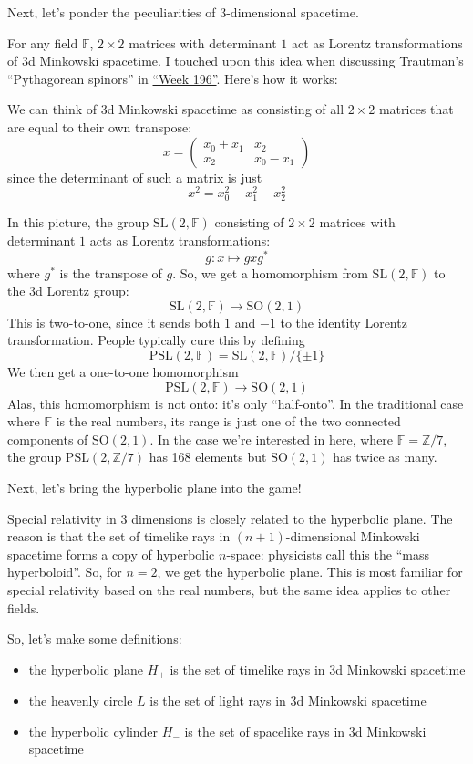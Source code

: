 \documentclass{article}
\def\tightlist{}
\begin{document}
Next, let's ponder the peculiarities of \(3\)-dimensional spacetime.

For any field \(\mathbb{F}\), \(2\times2\) matrices with determinant
\(1\) act as Lorentz transformations of 3d Minkowski spacetime. I
touched upon this idea when discussing Trautman's ``Pythagorean
spinors'' in \protect\hyperlink{week196}{``Week 196''}. Here's how it
works:

We can think of 3d Minkowski spacetime as consisting of all \(2\times2\)
matrices that are equal to their own transpose: \[
  x = \left(
    \begin{array}{cc}
      x_0+x_1 & x_2
    \\x_2 & x_0-x_1
    \end{array}
  \right)
\] since the determinant of such a matrix is just
\[x^2 = x_0^2 - x_1^2 - x_2^2\]

In this picture, the group \(\mathrm{SL}(2,\mathbb{F})\) consisting of
\(2\times2\) matrices with determinant \(1\) acts as Lorentz
transformations: \[g\colon x \mapsto gxg^*\] where \(g^*\) is the
transpose of \(g\). So, we get a homomorphism from
\(\mathrm{SL}(2,\mathbb{F})\) to the 3d Lorentz group:
\[\mathrm{SL}(2,\mathbb{F}) \to \mathrm{SO}(2,1)\] This is two-to-one,
since it sends both \(1\) and \(-1\) to the identity Lorentz
transformation. People typically cure this by defining
\[\mathrm{PSL}(2,\mathbb{F}) = \mathrm{SL}(2,\mathbb{F})/\{\pm1\}\] We
then get a one-to-one homomorphism
\[\mathrm{PSL}(2,\mathbb{F}) \to \mathrm{SO}(2,1)\] Alas, this
homomorphism is not onto: it's only ``half-onto''. In the traditional
case where \(\mathbb{F}\) is the real numbers, its range is just one of
the two connected components of \(\mathrm{SO}(2,1)\). In the case we're
interested in here, where \(\mathbb{F} = \mathbb{Z}/7\), the group
\(\mathrm{PSL}(2,\mathbb{Z}/7)\) has 168 elements but
\(\mathrm{SO}(2,1)\) has twice as many.

Next, let's bring the hyperbolic plane into the game!

Special relativity in 3 dimensions is closely related to the hyperbolic
plane. The reason is that the set of timelike rays in
\((n+1)\)-dimensional Minkowski spacetime forms a copy of hyperbolic
\(n\)-space: physicists call this the ``mass hyperboloid''. So, for
\(n = 2\), we get the hyperbolic plane. This is most familiar for
special relativity based on the real numbers, but the same idea applies
to other fields.

So, let's make some definitions:

\begin{itemize}
\tightlist
\item
  the hyperbolic plane \(H_+\) is the set of timelike rays in 3d
  Minkowski spacetime
\item
  the heavenly circle \(L\) is the set of light rays in 3d Minkowski
  spacetime
\item
  the hyperbolic cylinder \(H_-\) is the set of spacelike rays in 3d
  Minkowski spacetime
\end{itemize}
\end{document}
